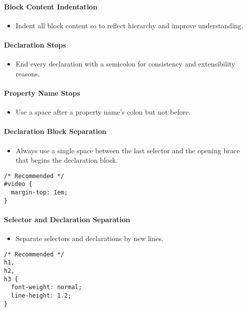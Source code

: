 \documentclass[a4paper, 11pt]{article}
\begin{document}
\paragraph{Block Content Indentation}
\begin{itemize}
\item Indent all block content so to reflect hierarchy and improve understanding.
\end{itemize}

\paragraph{Declaration Stops}
\begin{itemize}
\item End every declaration with a semicolon for consistency and extensibility reasons.
\end{itemize}

\paragraph{Property Name Stops}
\begin{itemize}
\item Use a space after a property name’s colon but not before.
\end{itemize}

\paragraph{Declaration Block Separation}
\begin{itemize}
\item Always use a single space between the last selector and the opening brace that begins the declaration block.
\end{itemize}
\begin{verbatim}
/* Recommended */
#video {
  margin-top: 1em;
}
\end{verbatim}

\paragraph{Selector and Declaration Separation}
\begin{itemize}
\item Separate selectors and declarations by new lines.
\end{itemize}
\begin{verbatim}
/* Recommended */
h1,
h2,
h3 {
  font-weight: normal;
  line-height: 1.2;
}
\end{verbatim}
\end{document}
